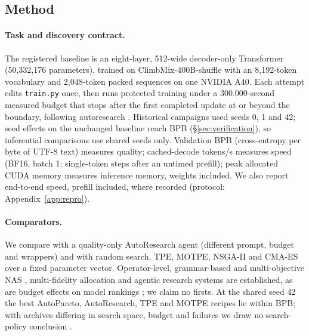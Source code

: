 \documentclass{article}
\begin{document}
\subsection{Method}
\paragraph{Task and discovery contract.} The registered baseline is an eight-layer, 512-wide decoder-only Transformer (50,332,176 parameters), trained on ClimbMix-400B-shuffle with an 8,192-token vocabulary and 2,048-token packed sequences on one NVIDIA A40. Each attempt edits \texttt{train.py} once, then runs protected training under a 300.000-second measured budget that stops after the first completed update at or beyond the boundary, following autoresearch \citep{autoresearch}. Historical campaigns used seeds 0, 1 and 42; seed effects on the unchanged baseline reach \CRBaseSeedEffect{} BPB (\S\ref{sec:verification}), so inferential comparisons use shared seeds only. Validation BPB (cross-entropy per byte of UTF-8 text) measures quality; cached-decode tokens/s measures speed (BF16, batch 1; single-token steps after an untimed prefill); peak allocated CUDA memory measures inference memory, weights included. We also report end-to-end speed, prefill included, where recorded (protocol: Appendix~\ref{app:repro}).

\paragraph{Comparators.} We compare with a quality-only AutoResearch agent (different prompt, budget and wrappers) and with random search, TPE, MOTPE, NSGA-II and CMA-ES \citep{bergstra2011tpe,ozaki2020motpe,deb2002nsga2,hansen2001cmaes} over a fixed parameter vector. Operator-level, grammar-based and multi-objective NAS \citep{primer,einspace,mote,monaq}, multi-fidelity allocation \citep{hyperband,bohb} and agentic research systems \citep{autodiscovery,mlestar,airesearcher,mledojo} are established, as are budget effects on model rankings \citep{dehghani2022efficiency,geiping2023cramming,hoffmann2022chinchilla}; we claim no firsts. At the shared seed 42 the best AutoPareto, AutoResearch, TPE and MOTPE recipes lie within \CRSeedFortyTwoSpread{} BPB; with archives differing in search space, budget and failures we draw no search-policy conclusion \citep[cf.][]{ferreira}.
\end{document}
